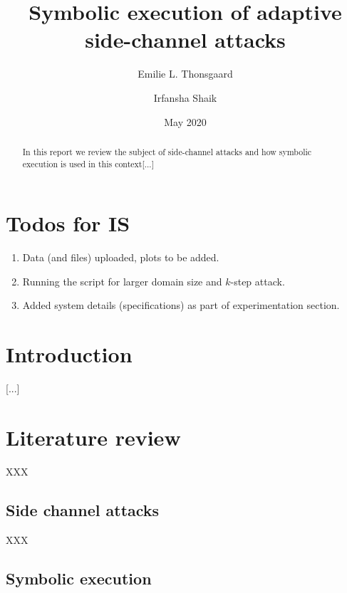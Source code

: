 \documentclass[11pt,a4paper,notitlepage]{article}
\title{Symbolic execution of adaptive side-channel attacks}
\author{Emilie L. Thonsgaard \and Irfansha Shaik}
\date{May 2020}
\begin{document}
\begin{titlingpage}
    \maketitle
    \begin{abstract}
        In this report we review the subject of side-channel attacks and how symbolic execution is used in this context[...]
    \end{abstract}
\end{titlingpage}

\tableofcontents
\newpage
\setcounter{section}{-1}


\section{Todos for IS}
\label{sec:todosforis}

\begin{enumerate}
  \item Data (and files) uploaded, plots to be added.
  \item Running the script for larger domain size and $k$-step attack.
  \item Added system details (specifications) as part of experimentation section.
\end{enumerate}

\newpage

\section{Introduction}
\label{cha:introduction}

[...]

\newpage

\section{Literature review}
\label{cha:literaturereview}

XXX

\subsection{Side channel attacks}
\label{sec:sidechannelattacks}

XXX 

\subsection{Symbolic execution}
\label{sec:symbolicexecution}
\end{document}
